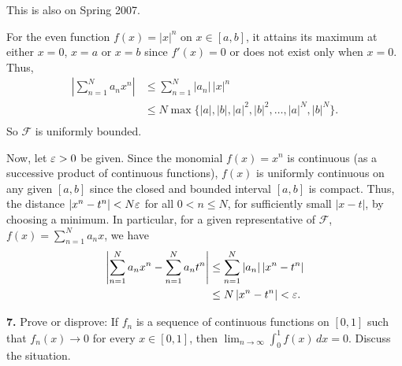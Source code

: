 \documentclass{homework}
\begin{document}
\begin{solution}
This is also on Spring 2007.

For the even function $f(x) = |x|^n$ on $x\in[a,b]$, it attains its maximum at either $x = 0$, $x=a$ or $x=b$ since $f'(x) = 0$ or does not exist only when $x=0$.  Thus,
\begin{align*}
  \left| \sum_{n=1}^N a_n x^n \right| 
  &\le \sum_{n=1}^N |a_n|\, |x|^n\\
  &\le N \max\{|a|,|b|,|a|^2,|b|^2,\dots,|a|^N,|b|^N\}.\\
\end{align*}
So $\mathcal F$ is uniformly bounded.

Now, let $\varepsilon >0$ be given.  Since the monomial $f(x) = x^n$ is continuous (as
a successive product of continuous functions), $f(x)$ is uniformly continuous
on any given $[a,b]$ since the closed and bounded interval $[a,b]$ is compact. Thus, the distance $|x^n - t^n|< N\varepsilon$ for all $0<n\le N$, for sufficiently small $|x-t|$, by choosing a minimum.  
In particular, for a given representative of $\mathcal F$, $f(x) = \sum_{n=1}^N a_n x$, we have
\begin{align*}
  \left|\sum_{n=1}^N a_n x^n - \sum_{n=1}^N a_n t^n\right|
  &\le \sum_{n=1}^N |a_n| \left|x^n - t^n\right| \\
  &\le N \left|x^n - t^n\right| 
  < \varepsilon.
  \end{align*}
\end{solution}

{\bf 7.} Prove or disprove: If ${f_n}$ is a sequence of continuous functions on $[0,1]$ such that $f_n(x)\to 0$ for every $x\in [0,1]$, then $\lim_{n\to\infty}\int_0^1f(x)\,dx=0$.  Discuss the situation.
\end{document}

